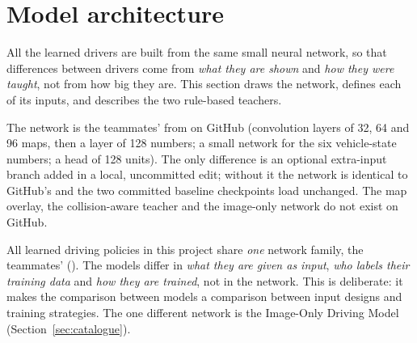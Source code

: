 \section{Model architecture}\label{sec:arch}

\begin{plainwords}
All the learned drivers are built from the same small neural network, so that differences between drivers come from \emph{what they are shown} and \emph{how they were taught}, not from how big they are. This section draws the network, defines each of its inputs, and describes the two rule-based teachers.
\end{plainwords}
\begin{cautionbox}
The network is the teammates'  from  on GitHub (convolution layers of 32, 64 and 96 maps, then a layer of 128 numbers; a small network for the six vehicle-state numbers; a head of 128 units). The only difference is an optional extra-input branch added in a local, uncommitted edit; without it the network is identical to GitHub's and the two committed baseline checkpoints load unchanged. The map overlay, the collision-aware teacher and the image-only network do not exist on GitHub.
\end{cautionbox}


All learned driving policies in this project share \emph{one} network family, the teammates'  (). The models differ in \emph{what they are given as input}, \emph{who labels their training data} and \emph{how they are trained},
not in the network. This is deliberate: it makes the comparison between models a comparison between input designs and training strategies. The one different network is the Image-Only Driving Model (Section~\ref{sec:catalogue}).

